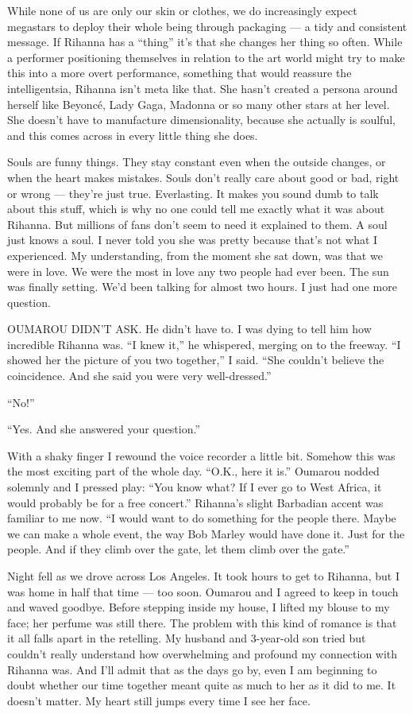 While none of us are only our skin or clothes, we do increasingly expect
megastars to deploy their whole being through packaging --- a tidy and
consistent message. If Rihanna has a ``thing'' it's that she changes her
thing so often. While a performer positioning themselves in relation to
the art world might try to make this into a more overt performance,
something that would reassure the intelligentsia, Rihanna isn't meta
like that. She hasn't created a persona around herself like Beyoncé,
Lady Gaga, Madonna or so many other stars at her level. She doesn't have
to manufacture dimensionality, because she actually is soulful, and this
comes across in every little thing she does.

Souls are funny things. They stay constant even when the outside
changes, or when the heart makes mistakes. Souls don't really care about
good or bad, right or wrong --- they're just true. Everlasting. It makes
you sound dumb to talk about this stuff, which is why no one could tell
me exactly what it was about Rihanna. But millions of fans don't seem to
need it explained to them. A soul just knows a soul. I never told you
she was pretty because that's not what I experienced. My understanding,
from the moment she sat down, was that we were in love. We were the most
in love any two people had ever been. The sun was finally setting. We'd
been talking for almost two hours. I just had one more question.

OUMAROU DIDN'T ASK. He didn't have to. I was dying to tell him how
incredible Rihanna was. ``I knew it,'' he whispered, merging on to the
freeway. ``I showed her the picture of you two together,'' I said. ``She
couldn't believe the coincidence. And she said you were very
well-dressed.''

``No!''

``Yes. And she answered your question.''

With a shaky finger I rewound the voice recorder a little bit. Somehow
this was the most exciting part of the whole day. ``O.K., here it is.''
Oumarou nodded solemnly and I pressed play: ``You know what? If I ever
go to West Africa, it would probably be for a free concert.'' Rihanna's
slight Barbadian accent was familiar to me now. ``I would want to do
something for the people there. Maybe we can make a whole event, the way
Bob Marley would have done it. Just for the people. And if they climb
over the gate, let them climb over the gate.''

Night fell as we drove across Los Angeles. It took hours to get to
Rihanna, but I was home in half that time --- too soon. Oumarou and I
agreed to keep in touch and waved goodbye. Before stepping inside my
house, I lifted my blouse to my face; her perfume was still there. The
problem with this kind of romance is that it all falls apart in the
retelling. My husband and 3-year-old son tried but couldn't really
understand how overwhelming and profound my connection with Rihanna was.
And I'll admit that as the days go by, even I am beginning to doubt
whether our time together meant quite as much to her as it did to me. It
doesn't matter. My heart still jumps every time I see her face.

